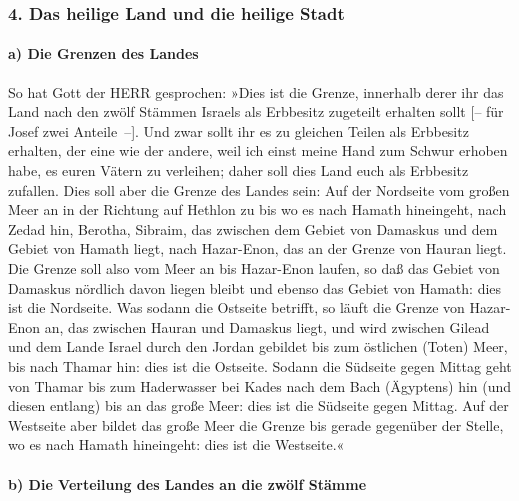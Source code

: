 \hypertarget{das-heilige-land-und-die-heilige-stadt}{%
\subsubsection{4. Das heilige Land und die heilige
Stadt}\label{das-heilige-land-und-die-heilige-stadt}}

\hypertarget{a-die-grenzen-des-landes}{%
\paragraph{a) Die Grenzen des Landes}\label{a-die-grenzen-des-landes}}

So hat Gott der HERR gesprochen: »Dies ist die Grenze,
innerhalb derer ihr das Land nach den zwölf Stämmen Israels als
Erbbesitz zugeteilt erhalten sollt {[}-- für Josef zwei Anteile~--{]}.
Und zwar sollt ihr es zu gleichen Teilen als Erbbesitz
erhalten, der eine wie der andere, weil ich einst meine Hand zum Schwur
erhoben habe, es euren Vätern zu verleihen; daher soll dies Land euch
als Erbbesitz zufallen. Dies soll aber die Grenze des
Landes sein: Auf der Nordseite vom großen Meer an in der Richtung auf
Hethlon zu bis wo es nach Hamath hineingeht, nach Zedad hin,
Berotha, Sibraim, das zwischen dem Gebiet von Damaskus
und dem Gebiet von Hamath liegt, nach Hazar-Enon, das an der Grenze von
Hauran liegt. Die Grenze soll also vom Meer an bis
Hazar-Enon laufen, so daß das Gebiet von Damaskus nördlich davon liegen
bleibt und ebenso das Gebiet von Hamath: dies ist die Nordseite.
Was sodann die Ostseite betrifft, so läuft die Grenze von
Hazar-Enon an, das zwischen Hauran und Damaskus liegt, und wird zwischen
Gilead und dem Lande Israel durch den Jordan gebildet bis zum östlichen
(Toten) Meer, bis nach Thamar hin: dies ist die Ostseite.
Sodann die Südseite gegen Mittag geht von Thamar bis zum
Haderwasser bei Kades nach dem Bach (Ägyptens) hin (und diesen entlang)
bis an das große Meer: dies ist die Südseite gegen Mittag.
Auf der Westseite aber bildet das große Meer die Grenze
bis gerade gegenüber der Stelle, wo es nach Hamath hineingeht: dies ist
die Westseite.«

\hypertarget{b-die-verteilung-des-landes-an-die-zwuxf6lf-stuxe4mme}{%
\paragraph{b) Die Verteilung des Landes an die zwölf
Stämme}\label{b-die-verteilung-des-landes-an-die-zwuxf6lf-stuxe4mme}}

